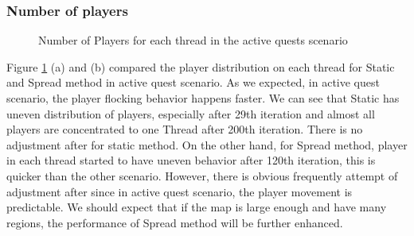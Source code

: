 \documentclass[12pt,a4paper]{article} %
\theoremstyle{definition}
\theoremstyle{remark}
\begin{document}
\subsubsection {Number of players}
\begin{figure}[!ht]
	\hfill
	\caption{Number of Players for each thread in the active quests scenario}
	\label{Player_random_active}
\end{figure}
Figure \ref{Player_random_active} (a) and (b) compared the player distribution on each thread for Static and Spread method in active quest scenario. 
As we expected, in active quest  scenario, the player flocking behavior happens faster.
We can see that Static
has uneven distribution of players, especially after 29th iteration and almost all players are concentrated to one Thread after 200th iteration. There is no adjustment after for static method. 
On the other hand, for Spread method, player in each thread started to have uneven behavior after 120th iteration, this is quicker than the other scenario. However, there is obvious frequently attempt of adjustment after since in active quest scenario, the player movement is predictable.
We should expect that if the map is large enough and have many regions, the performance of Spread method will be further enhanced.
\end{document}
